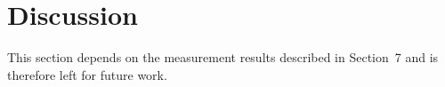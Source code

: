 \section{Discussion}
This section depends on the measurement results described in Section~7 and is therefore
left for future work.



